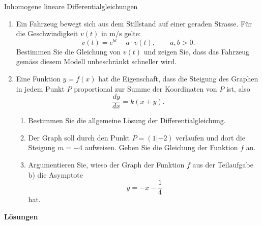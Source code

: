 \begin{ueb}{Inhomogene lineare Differentialgleichungen}{}
\begin{enumerate}
\begin{enumerate}
                  \item Geben Sie die Gleichung der
                        Funktion \(f\) an.

                  \item Geben Sie die Gleichung der
                        Asymptote von \(y=f(x)\) an.
              \end{enumerate}
        \item Ein Fahrzeug bewegt sich aus dem Stillstand auf
              einer geraden Strasse. Für die Geschwindigkeit
              \(v(t)\) in \(\mathrm{m/s}\) gelte:
              \[
                  \dot{v}(t)=e^{bt}-a\cdot v(t),
                  \qquad a,b>0.
              \]
              Bestimmen Sie die Gleichung von \(v(t)\) und zeigen
              Sie, dass das Fahrzeug gemäss diesem Modell
              unbeschränkt schneller wird.

        \item Eine Funktion \(y=f(x)\) hat die Eigenschaft,
              dass die Steigung des Graphen in jedem Punkt \(P\)
              proportional zur Summe der Koordinaten von \(P\) ist,
              also
              \[
                  \frac{dy}{dx}=k(x+y).
              \]

              \begin{enumerate}
                  \item Bestimmen Sie die allgemeine Lösung
                        der Differentialgleichung.

                  \item Der Graph soll durch den Punkt
                        \(P=(1|-2)\) verlaufen und dort die
                        Steigung \(m=-4\) aufweisen.
                        Geben Sie die Gleichung der Funktion
                        \(f\) an.

                  \item Argumentieren Sie, wieso der Graph
                        der Funktion \(f\) aus der Teilaufgabe b)
                        die Asymptote
                        \[
                            y=-x-\frac14
                        \]
                        hat.
              \end{enumerate}
    \end{enumerate}
\end{ueb}

\clearpage

\textbf{Lösungen}

